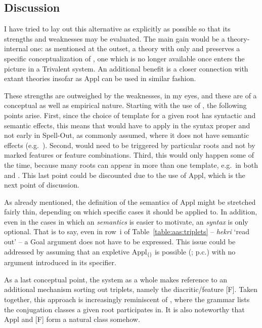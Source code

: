 \begin{exe}
\begin{xlist}
\begin{exe}
\begin{exe}
\begin{xlist}
\begin{exe}
\begin{exe}
\begin{exe}
\begin{exe}
\begin{exe}
\begin{xlist}
\begin{exe}
\begin{exe}
\begin{xlist}
\begin{exe}
\begin{xlist}
\begin{exe}
\begin{xlist}
\begin{exe}
\begin{xlist}
	\subsection{Discussion} \label{aas:jim:cons}
I have tried to lay out this alternative as explicitly as possible so that its strengths and weaknesses may be evaluated. The main gain would be a theory-internal one: as mentioned at the outset, a theory with only {\vds} and {\vzs} preserves a specific conceptualization of , one which is no longer available once  enters the picture in a Trivalent system. An additional benefit is a closer connection with extant theories insofar as Appl can be used in similar fashion.

These strengths are outweighed by the weaknesses, in my eyes, and these are of a conceptual as well as empirical nature. Starting with the use of , the following points arise. First, since the choice of template for a given root has syntactic and semantic effects, this means that  would have to apply in the syntax proper and not early in Spell-Out, as commonly assumed, where it does not have semantic effects (e.g.~\citealt{harbour03}). Second,  would need to be triggered by particular roots and not by marked features or feature combinations. Third, this would only happen some of the time, because many roots can appear in more than one template, e.g.~in both {\thif} and {\tkal}. This last point could be discounted due to the use of Appl, which is the next point of discussion.

As already mentioned, the definition of the semantics of Appl might be stretch\-ed fairly thin, depending on which specific cases it should be applied to. In addition, even in the cases in which an  \emph{semantics} is easier to motivate, an  \emph{syntax} is only optional. That is to say, even in row~i of Table~\ref{table:aas:triplets} -- \emph{hekri} `read out' -- a Goal argument does not have to be expressed. This issue could be addressed by assuming that an expletive Appl$_{\text{\{\}}}$ is possible (\citealt{wood15springer}; p.c.) with no argument introduced in its specifier.

As a last conceptual point, the system as a whole makes reference to an additional mechanism sorting out triplets, namely the diacritic/feature [F]. Taken together, this approach is increasingly reminiscent of \cite{arad05}, where the grammar lists the conjugation classes a given root participates in. It is also noteworthy that Appl and [F] form a natural class somehow. 


\end{xlist}
\end{exe}
\end{xlist}
\end{exe}
\end{xlist}
\end{exe}
\end{xlist}
\end{exe}
\end{exe}
\end{xlist}
\end{exe}
\end{exe}
\end{exe}
\end{exe}
\end{exe}
\end{xlist}
\end{exe}
\end{exe}
\end{xlist}
\end{exe}
